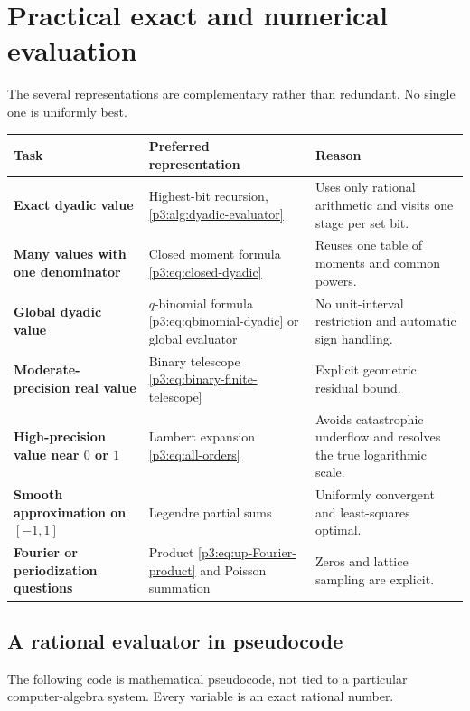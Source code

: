 \documentclass[11pt]{article}
\numberwithin{equation}{section}
\theoremstyle{definition}
\theoremstyle{remark}
\begin{document}
\section{Practical exact and numerical evaluation}\label{p3:sec:computation}

The several representations are complementary rather than redundant.  No
single one is uniformly best.

\begin{center}
\begin{tabularx}{\textwidth}{>{\bfseries}p{}X X}
\toprule
Task & Preferred representation & Reason\\
\midrule
Exact dyadic value & Highest-bit recursion, \cref{p3:alg:dyadic-evaluator} &
Uses only rational arithmetic and visits one stage per set bit.\\
Many values with one denominator & Closed moment formula
\eqref{p3:eq:closed-dyadic} & Reuses one table of moments and common powers.\\
Global dyadic value & $q$-binomial formula \eqref{p3:eq:qbinomial-dyadic} or
global evaluator & No unit-interval restriction and automatic sign handling.\\
Moderate-precision real value & Binary telescope
\eqref{p3:eq:binary-finite-telescope} & Explicit geometric residual bound.\\
High-precision value near $0$ or $1$ & Lambert expansion
\eqref{p3:eq:all-orders} & Avoids catastrophic underflow and resolves the true
logarithmic scale.\\
Smooth approximation on $[-1,1]$ & Legendre partial sums & Uniformly
convergent and least-squares optimal.\\
Fourier or periodization questions & Product
\eqref{p3:eq:up-Fourier-product} and Poisson summation & Zeros and lattice
sampling are explicit.\\
\bottomrule
\end{tabularx}
\end{center}

\subsection{A rational evaluator in pseudocode}

The following code is mathematical pseudocode, not tied to a particular
computer-algebra system.  Every variable is an exact rational number.
\end{document}
